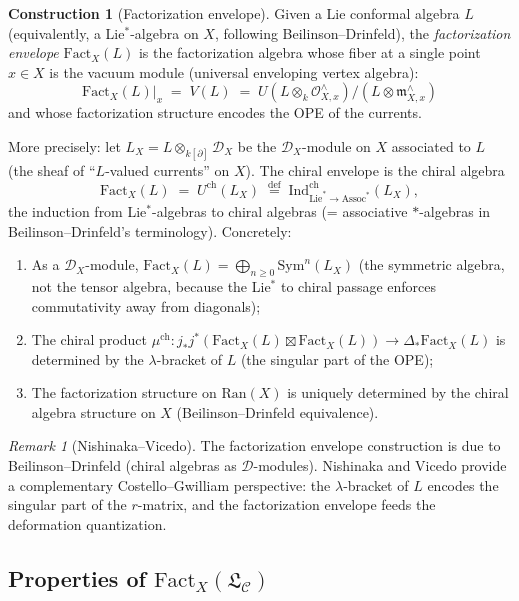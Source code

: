 \documentclass[11pt]{article}
\theoremstyle{plain}
\theoremstyle{definition}
\newtheorem{construction}[theorem]{Construction}
\theoremstyle{remark}
\newtheorem{remark}[theorem]{Remark}
\newcommand{\Sym}{\mathrm{Sym}}
\newcommand{\Ran}{\mathrm{Ran}}
\newcommand{\Fact}{\mathrm{Fact}}
\newcommand{\cC}{\mathcal{C}}
\newcommand{\cD}{\mathcal{D}}
\newcommand{\cO}{\mathcal{O}}
\newcommand{\frakL}{\mathfrak{L}}
\begin{document}
\begin{construction}[Factorization envelope]
\label{constr:fact-envelope}
Given a Lie conformal algebra $L$ (equivalently, a Lie$^*$-algebra on $X$, following Beilinson--Drinfeld), the \emph{factorization envelope} $\Fact_X(L)$ is the factorization algebra whose fiber at a single point $x \in X$ is the vacuum module (universal enveloping vertex algebra):
\[
\Fact_X(L)|_x \;=\; V(L) \;=\; U(L \otimes_k \cO_{X,x}^\wedge) / (L \otimes \mathfrak{m}_{X,x}^\wedge)
\]
and whose factorization structure encodes the OPE of the currents.

More precisely: let $L_X = L \otimes_{k[\partial]} \cD_X$ be the $\cD_X$-module on $X$ associated to $L$ (the sheaf of ``$L$-valued currents'' on $X$). The chiral envelope is the chiral algebra
\[
\Fact_X(L) \;=\; U^{\mathrm{ch}}(L_X) \;\stackrel{\mathrm{def}}{=}\; \mathrm{Ind}^{\mathrm{ch}}_{\mathrm{Lie}^* \to \mathrm{Assoc}^*}(L_X),
\]
the induction from Lie$^*$-algebras to chiral algebras (= associative $*$-algebras in Beilinson--Drinfeld's terminology). Concretely:
\begin{enumerate}[label=(\alph*)]
\item As a $\cD_X$-module, $\Fact_X(L) = \bigoplus_{n \geq 0} \Sym^n(L_X)$ (the symmetric algebra, not the tensor algebra, because the Lie$^*$ to chiral passage enforces commutativity away from diagonals);
\item The chiral product $\mu^{\mathrm{ch}} \colon j_*j^*(\Fact_X(L) \boxtimes \Fact_X(L)) \to \Delta_* \Fact_X(L)$ is determined by the $\lambda$-bracket of $L$ (the singular part of the OPE);
\item The factorization structure on $\Ran(X)$ is uniquely determined by the chiral algebra structure on $X$ (Beilinson--Drinfeld equivalence).
\end{enumerate}
\end{construction}

\begin{remark}[Nishinaka--Vicedo]
\label{rem:nishinaka-vicedo}
The factorization envelope construction is due to Beilinson--Drinfeld
(chiral algebras as $\cD$-modules). Nishinaka and Vicedo provide a
complementary Costello--Gwilliam perspective: the $\lambda$-bracket of
$L$ encodes the singular part of the $r$-matrix, and the factorization
envelope feeds the deformation quantization.
\end{remark}

\subsection{Properties of $\Fact_X(\frakL_\cC)$}
\label{sec:fact-properties}
\end{document}
